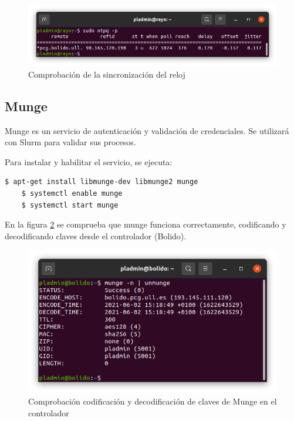 \begin{figure}[htb]
   \centering
   \includegraphics[width=0.9\linewidth]{images/ntpq-check.png}
   \caption{Comprobación de la sincronización del reloj}
   \label{ntp:checksync}
\end{figure}

\subsection{Munge}
\vspace{4mm}

Munge es un servicio de autenticación y validación de credenciales. Se utilizará con Slurm para validar sus procesos.
\vspace{2mm}

Para instalar y habilitar el servicio, se ejecuta:

\begin{lstlisting}[language=bash]
    $ apt-get install libmunge-dev libmunge2 munge
    $ systemctl enable munge
    $ systemctl start munge
\end{lstlisting}
\vspace{2mm}

En la figura \ref{munge:controllercheck} se comprueba que munge funciona correctamente, codificando y decodificando claves desde el controlador (Bolido).


\begin{figure}[htb]
   \centering
   \includegraphics[width=0.8\linewidth]{images/mungecontroller.png}
   \caption{Comprobación codificación y decodificación de claves de Munge en el controlador}
   \label{munge:controllercheck}
\end{figure}
\vspace{2mm}

